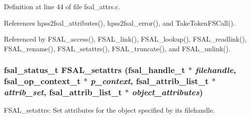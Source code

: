 Definition at line 44 of file fsal\_\-attrs.c.

References hpss2fsal\_\-attributes(), hpss2fsal\_\-error(), and Take\-Token\-FSCall().

Referenced by FSAL\_\-access(), FSAL\_\-link(), FSAL\_\-lookup(), FSAL\_\-readlink(), FSAL\_\-rename(), FSAL\_\-setattrs(), FSAL\_\-truncate(), and FSAL\_\-unlink().
\subsubsection{\setlength{\rightskip}{0pt plus 5cm}fsal\_\-status\_\-t FSAL\_\-setattrs (fsal\_\-handle\_\-t $\ast$ {\em filehandle}, fsal\_\-op\_\-context\_\-t $\ast$ {\em p\_\-context}, fsal\_\-attrib\_\-list\_\-t $\ast$ {\em attrib\_\-set}, fsal\_\-attrib\_\-list\_\-t $\ast$ {\em object\_\-attributes})}\label{fsal__attrs_8c_a1}


FSAL\_\-setattrs: Set attributes for the object specified by its filehandle.

